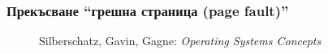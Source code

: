 \documentclass[ignorenonframetext, hyperref=unicode]{beamer}
\begin{document}
\begin{frame}
\frametitle{Прекъсване ``грешна страница (page fault)''}
\begin{figure}[h]
\center
{}
\caption{Silberschatz, Gavin, Gagne: {\em Operating Systems Concepts}}
\end{figure}
\end{frame}
\end{document}
